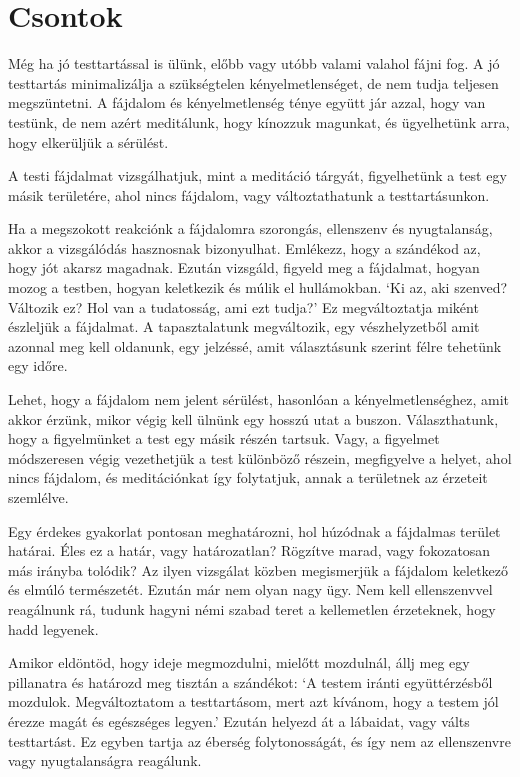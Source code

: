 \chapter{Csontok}


\noindent Még ha jó testtartással is ülünk, előbb vagy utóbb valami
valahol fájni fog. A jó testtartás minimalizálja a szükségtelen
kényelmetlenséget, de nem tudja teljesen megszüntetni. A fájdalom és
kényelmetlenség ténye együtt jár azzal, hogy van testünk, de nem azért
meditálunk, hogy kínozzuk magunkat, és ügyelhetünk arra, hogy elkerüljük
a sérülést.

A testi fájdalmat vizsgálhatjuk, mint a meditáció tárgyát, figyelhetünk
a test egy másik területére, ahol nincs fájdalom, vagy változtathatunk a
testtartásunkon.

Ha a megszokott reakciónk a fájdalomra szorongás, ellenszenv és
nyugtalanság, akkor a vizsgálódás hasznosnak bizonyulhat. Emlékezz, hogy
a szándékod az, hogy jót akarsz magadnak. Ezután vizsgáld, figyeld meg a
fájdalmat, hogyan mozog a testben, hogyan keletkezik és múlik el
hullámokban. `Ki az, aki szenved? Változik ez? Hol van a tudatosság, ami
ezt tudja?' Ez megváltoztatja miként észleljük a fájdalmat. A
tapasztalatunk megváltozik, egy vészhelyzetből amit azonnal meg kell
oldanunk, egy jelzéssé, amit választásunk szerint félre tehetünk egy
időre.

Lehet, hogy a fájdalom nem jelent sérülést, hasonlóan a
kényelmetlenséghez, amit akkor érzünk, mikor végig kell ülnünk egy
hosszú utat a buszon. Választhatunk, hogy a figyelmünket a test egy
másik részén tartsuk. Vagy, a figyelmet módszeresen végig vezethetjük a
test különböző részein, megfigyelve a helyet, ahol nincs fájdalom, és
meditációnkat így folytatjuk, annak a területnek az érzeteit szemlélve.

Egy érdekes gyakorlat pontosan meghatározni, hol húzódnak a fájdalmas
terület határai. Éles ez a határ, vagy határozatlan? Rögzítve marad,
vagy fokozatosan más irányba tolódik? Az ilyen vizsgálat közben
megismerjük a fájdalom keletkező és elmúló természetét. Ezután már nem
olyan nagy ügy. Nem kell ellenszenvvel reagálnunk rá, tudunk hagyni némi
szabad teret a kellemetlen érzeteknek, hogy hadd legyenek.

Amikor eldöntöd, hogy ideje megmozdulni, mielőtt mozdulnál, állj meg egy
pillanatra és határozd meg tisztán a szándékot: `A testem iránti
együttérzésből mozdulok. Megváltoztatom a testtartásom, mert azt
kívánom, hogy a testem jól érezze magát és egészséges legyen.' Ezután
helyezd át a lábaidat, vagy válts testtartást. Ez egyben tartja az
éberség folytonosságát, és így nem az ellenszenvre vagy nyugtalanságra
reagálunk.

